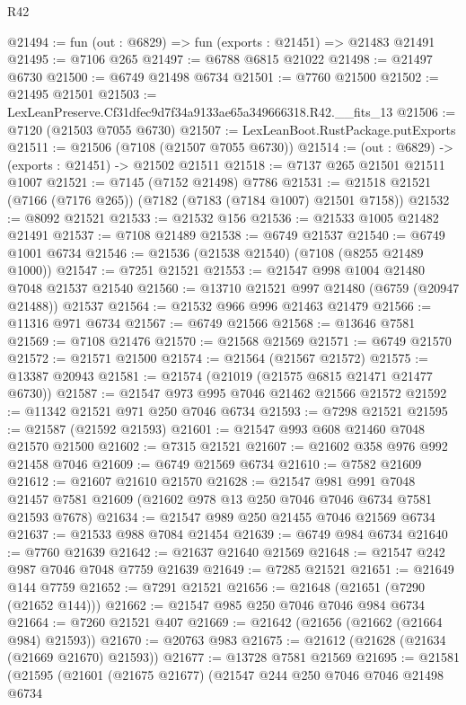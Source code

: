 \begin{lexlean}{R42}
\begin{coremodule}
{@21494 := fun (out : @6829) => fun (exports : @21451) => @21483 @21491
@21495 := @7106 @265
@21497 := @6788 @6815 @21022
@21498 := @21497 @6730
@21500 := @6749 @21498 @6734
@21501 := @7760 @21500
@21502 := @21495 @21501
@21503 := LexLeanPreserve.Cf31dfec9d7f34a9133ae65a349666318.R42.__fits_13
@21506 := @7120 (@21503 @7055 @6730)
@21507 := LexLeanBoot.RustPackage.putExports
@21511 := @21506 (@7108 (@21507 @7055 @6730))
@21514 := (out : @6829) -> (exports : @21451) -> @21502 @21511
@21518 := @7137 @265 @21501 @21511 @1007
@21521 := @7145 (@7152 @21498) @7786
@21531 := @21518 @21521 (@7166 (@7176 @265)) (@7182 (@7183 (@7184 @1007) @21501 @7158))
@21532 := @8092 @21521
@21533 := @21532 @156
@21536 := @21533 @1005 @21482 @21491
@21537 := @7108 @21489
@21538 := @6749 @21537
@21540 := @6749 @1001 @6734
@21546 := @21536 (@21538 @21540) (@7108 (@8255 @21489 @1000))
@21547 := @7251 @21521
@21553 := @21547 @998 @1004 @21480 @7048 @21537 @21540
@21560 := @13710 @21521 @997 @21480 (@6759 (@20947 @21488)) @21537
@21564 := @21532 @966 @996 @21463 @21479
@21566 := @11316 @971 @6734
@21567 := @6749 @21566
@21568 := @13646 @7581
@21569 := @7108 @21476
@21570 := @21568 @21569
@21571 := @6749 @21570
@21572 := @21571 @21500
@21574 := @21564 (@21567 @21572)
@21575 := @13387 @20943
@21581 := @21574 (@21019 (@21575 @6815 @21471 @21477 @6730))
@21587 := @21547 @973 @995 @7046 @21462 @21566 @21572
@21592 := @11342 @21521 @971 @250 @7046 @6734
@21593 := @7298 @21521
@21595 := @21587 (@21592 @21593)
@21601 := @21547 @993 @608 @21460 @7048 @21570 @21500
@21602 := @7315 @21521
@21607 := @21602 @358 @976 @992 @21458 @7046
@21609 := @6749 @21569 @6734
@21610 := @7582 @21609
@21612 := @21607 @21610 @21570
@21628 := @21547
    @981
    @991
    @7048
    @21457
    @7581
    @21609
    (@21602 @978 @13 @250 @7046 @7046 @6734 @7581 @21593 @7678)
@21634 := @21547 @989 @250 @21455 @7046 @21569 @6734
@21637 := @21533 @988 @7084 @21454
@21639 := @6749 @984 @6734
@21640 := @7760 @21639
@21642 := @21637 @21640 @21569
@21648 := @21547 @242 @987 @7046 @7048 @7759 @21639
@21649 := @7285 @21521
@21651 := @21649 @144 @7759
@21652 := @7291 @21521
@21656 := @21648 (@21651 (@7290 (@21652 @144)))
@21662 := @21547 @985 @250 @7046 @7046 @984 @6734
@21664 := @7260 @21521 @407
@21669 := @21642 (@21656 (@21662 (@21664 @984) @21593))
@21670 := @20763 @983
@21675 := @21612 (@21628 (@21634 (@21669 @21670) @21593))
@21677 := @13728 @7581 @21569
@21695 := @21581
    (@21595
      (@21601
        (@21675 @21677)
        (@21547
          @244
          @250
          @7046
          @7046
          @21498
          @6734
}
\end{coremodule}
\end{lexlean}
